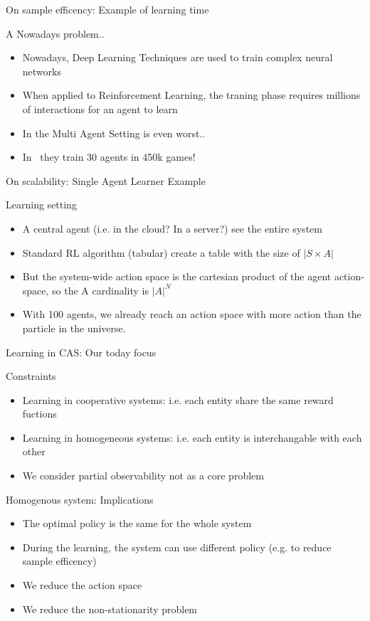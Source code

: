 \documentclass[presentation]{beamer}\mode<presentation>{\usetheme{AMSBolognaFC}}
\begin{document}
\begin{frame}{On sample efficency: Example of learning time }
	\begin{exampleblock}{A Nowadays problem..}
		\begin{itemize}
			\item Nowadays, Deep Learning Techniques are used to train complex neural networks
			\item When applied to Reinforcement Learning, the traning phase requires millions of interactions for an agent to learn
			\item In the Multi Agent Setting is even worst..
			\item In~\cite{DBLP:journals/corr/abs-1807-01281} they train 30 agents in 450k games!
		\end{itemize}
	\end{exampleblock}
\end{frame}
\begin{frame}{On scalability: Single Agent Learner Example}
	\begin{exampleblock}{Learning setting}
		\begin{itemize}
			\item A central agent (i.e. in the cloud? In a server?) see the entire system
			\item Standard RL algorithm (tabular) create a table with the size of $|S \times A|$
			\item But the system-wide action space is the cartesian product of the agent action-space, so the A cardinality is $|A|^N$
			\item With 100 agents, we already reach an action space with more action than the particle in the universe.
		\end{itemize}
	\end{exampleblock}
\end{frame}
\begin{frame}{Learning in CAS: Our today focus}
	\begin{alertblock}{Constraints}
		\begin{itemize}
			\item Learning in cooperative systems: i.e. each entity share the same reward fuctions
			\item Learning in homogeneous systems: i.e. each entity is interchangable with each other
			\item We consider partial observability not as a core problem
		\end{itemize}
	\end{alertblock}
	\begin{exampleblock}{Homogenous system: Implications}
		\begin{itemize}
			\item The optimal policy is the same for the whole system
			\item During the learning, the system can use different policy (e.g. to reduce sample efficency)
			\item We reduce the action space
			\item We reduce the non-stationarity problem
		\end{itemize}
	\end{exampleblock}
\end{frame}
\end{document}
